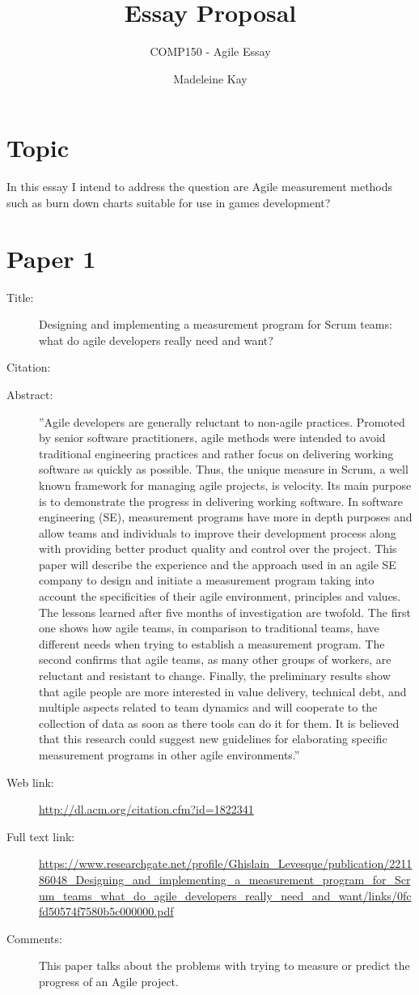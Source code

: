 \documentclass{scrartcl}
\title{Essay Proposal}
\subtitle{COMP150 - Agile Essay}
\author{Madeleine Kay}
\begin{document}
\maketitle

\section*{Topic}
In this essay I intend to address the question are Agile measurement methods such as burn down charts suitable for use in games development? 

\section*{Paper 1}
\begin{description}
	\item[Title:] Designing and implementing a measurement program for Scrum teams: what do agile developers really need and want?
	\item[Citation:] \cite{Ktata}
	\item[Abstract:] ''Agile developers are generally reluctant to non-agile practices. Promoted by senior software practitioners, agile methods were intended to avoid traditional engineering practices and rather focus on delivering working software as quickly as possible. Thus, the unique measure in Scrum, a well known framework for managing agile projects, is velocity. Its main purpose is to demonstrate the progress in delivering working software. In software engineering (SE), measurement programs have more in depth purposes and allow teams and individuals to improve their development process along with providing better product quality and control over the project. This paper will describe the experience and the approach used in an agile SE company to design and initiate a measurement program taking into account the specificities of their agile environment, principles and values. The lessons learned after five months of investigation are twofold. The first one shows how agile teams, in comparison to traditional teams, have different needs when trying to establish a measurement program. The second confirms that agile teams, as many other groups of workers, are reluctant and resistant to change. Finally, the preliminary results show that agile people are more interested in value delivery, technical debt, and multiple aspects related to team dynamics and will cooperate to the collection of data as soon as there tools can do it for them. It is believed that this research could suggest new guidelines for elaborating specific measurement programs in other agile environments.''
	\item[Web link:] \url{http://dl.acm.org/citation.cfm?id=1822341}
	\item[Full text link:] \url{https://www.researchgate.net/profile/Ghislain_Levesque/publication/221186048_Designing_and_implementing_a_measurement_program_for_Scrum_teams_what_do_agile_developers_really_need_and_want/links/0fcfd50574f7580b5c000000.pdf}
	\item[Comments:] This paper talks about the problems with trying to measure or predict the progress of an Agile project. 
\end{description}
\end{document}
